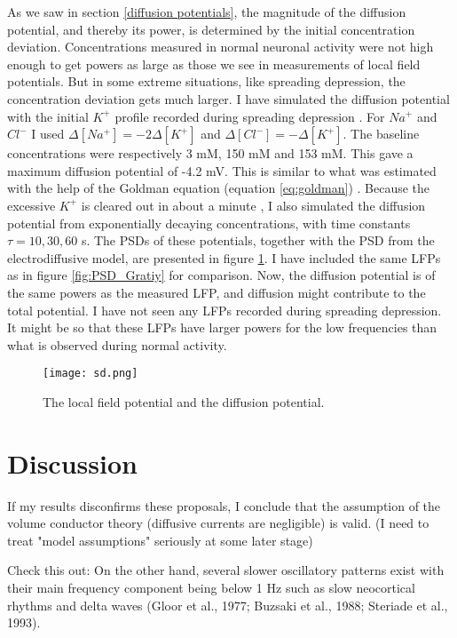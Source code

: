 \documentclass{article}
\begin{document}
As we saw in section \ref{diffusion potentials}, the magnitude of the diffusion potential, and thereby its power, is determined by the initial concentration deviation. Concentrations measured in normal neuronal activity were not high enough to get powers as large as those we see in measurements of local field potentials. But in some extreme situations, like spreading depression, the concentration deviation gets much larger. I have simulated the diffusion potential with the initial $K^+$ profile recorded during spreading depression \cite{Herreras1993}. For $Na^+$ and $Cl^-$ I used $\Delta [Na^+] = -2\Delta [K^+]$ and $\Delta [Cl^-] = -\Delta[K^+]$. The baseline concentrations were respectively 3 mM, 150 mM and 153 mM. This gave a maximum diffusion potential of -4.2 mV. This is similar to what was estimated with the help of the Goldman equation (equation \ref{eq:goldman}) \cite{Herreras1993}. Because the excessive $K^+$ is cleared out in about a minute \cite{Ataya2015}, I also simulated the diffusion potential from exponentially decaying concentrations, with time constants $\tau = 10, 30, 60 $ s. The PSDs of these potentials, together with the PSD from the electrodiffusive model, are presented in figure \ref{fig:sd}. I have included the same LFPs as in figure \ref{fig:PSD_Gratiy} for comparison. 
Now, the diffusion potential is of the same powers as the measured  LFP, and diffusion might contribute to the total potential. I have not seen any LFPs recorded during spreading depression. It might be so that these LFPs have larger powers for the low frequencies than what is observed during normal activity. 

\begin{figure}
  \texttt{[image: sd.png]}
  \caption{The local field potential and the diffusion potential. }
  \label{fig:sd}
\end{figure}



\section{Discussion}
If my results disconfirms these proposals, I conclude that the assumption of the volume conductor theory (diffusive currents are negligible) is valid. 
(I need to treat "model assumptions" seriously at some later stage)

Check this out: On the
other hand, several slower oscillatory patterns exist with their main
frequency component being below 1 Hz such as slow neocortical
rhythms and delta waves (Gloor et al., 1977; Buzsaki et al., 1988;
Steriade et al., 1993).
\end{document}

